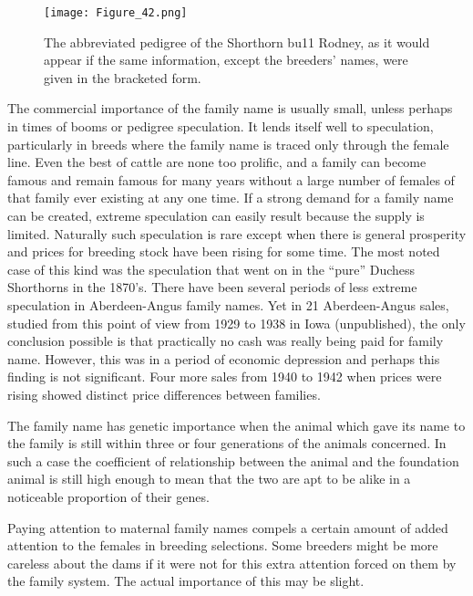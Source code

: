\begin{figure}
	\centering
    \texttt{[image: Figure\_42.png]}
    \caption{The abbreviated pedigree of the Shorthorn bu11 Rodney, as it would
			 appear if the same information, except the breeders' names, were
			 given in the bracketed form.}
    \label{fig:Lush_Figure_42}
\end{figure}

The commercial importance of the family name is usually small,
unless perhaps in times of booms or pedigree speculation. It lends itself
well to speculation, particularly in breeds where the family name is
traced only through the female line. Even the best of cattle are none
too prolific, and a family can become famous and remain famous for
many years without a large number of females of that family ever existing
at any one time. If a strong demand for a family name can be created,
extreme speculation can easily result because the supply is limited.
Naturally such speculation is rare except when there is general prosperity
and prices for breeding stock have been rising for some time. The
most noted case of this kind was the speculation that went on in the
``pure'' Duchess Shorthorns in the 1870's. There have been several
periods of less extreme speculation in Aberdeen-Angus family names.
Yet in 21 Aberdeen-Angus sales, studied from this point of view from
1929 to 1938 in Iowa (unpublished), the only conclusion possible is that
practically no cash was really being paid for family name. However, this
was in a period of economic depression and perhaps this finding is not
significant. Four more sales from 1940 to 1942 when prices were rising
showed distinct price differences between families.

The family name has genetic importance when the animal which
gave its name to the family is still within three or four generations of
the animals concerned. In such a case the coefficient of relationship
between the animal and the foundation animal is still high enough to
mean that the two are apt to be alike in a noticeable proportion of
their genes.

Paying attention to maternal family names compels a certain
amount of added attention to the females in breeding selections. Some
breeders might be more careless about the dams if it were not for this
extra attention forced on them by the family system. The actual importance
of this may be slight.


